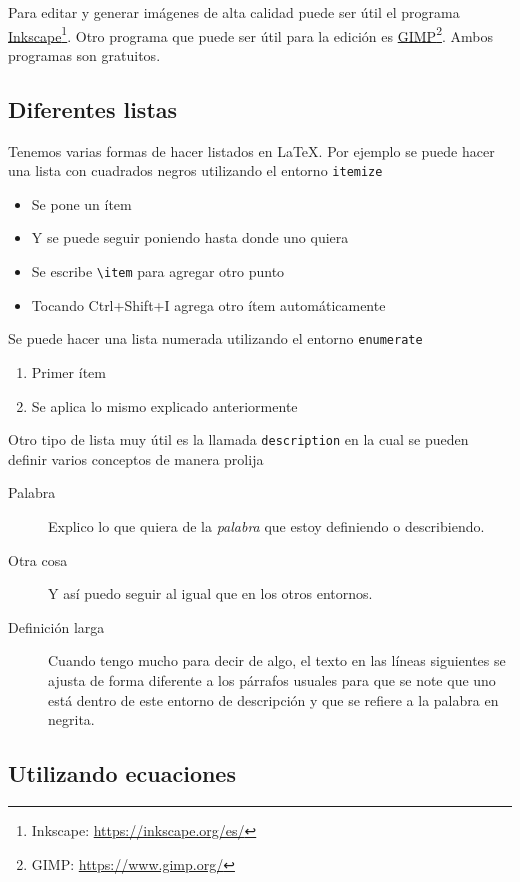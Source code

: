 \documentclass[a4paper,12pt]{article} %
\begin{document}
Para editar y generar imágenes de alta calidad puede ser útil el programa \href{https://inkscape.org/es/}{Inkscape}\footnote{Inkscape: \url{https://inkscape.org/es/}}. Otro programa que puede ser útil para la edición es \href{https://www.gimp.org/}{GIMP}\footnote{GIMP: \url{https://www.gimp.org/}}. Ambos programas son gratuitos.

\subsection{Diferentes listas}

	Tenemos varias formas de hacer listados en \LaTeX. Por ejemplo se puede hacer una lista con cuadrados negros utilizando el entorno \verb|itemize|
	\begin{itemize}
	\item Se pone un ítem
	\item Y se puede seguir poniendo hasta donde uno quiera
	\item Se escribe \verb|\item| para agregar otro punto 
	\item Tocando Ctrl+Shift+I agrega otro ítem automáticamente
	\end{itemize}
	
	Se puede hacer una lista numerada utilizando el entorno \verb|enumerate|
	\begin{enumerate}
	\item Primer ítem
	\item Se aplica lo mismo explicado anteriormente
	\end{enumerate}
	
	Otro tipo de lista muy útil es la llamada \verb|description| en la cual se pueden definir varios conceptos de manera prolija
	\begin{description}
	\item[Palabra] Explico lo que quiera de la \textit{palabra} que estoy definiendo o describiendo.
	\item[Otra cosa] Y así puedo seguir al igual que en los otros entornos.
	\item[Definición larga] Cuando tengo mucho para decir de algo, el texto en las líneas siguientes se ajusta de forma diferente a los párrafos usuales para que se note que uno está dentro de este entorno de descripción y que se refiere a la palabra en negrita.
	\end{description}
	
\subsection{Utilizando ecuaciones}
	
\end{document}
